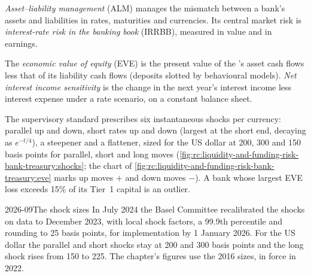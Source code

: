 \begin{definition}\label{def:rc:liquidity-and-funding-risk-bank-treasury:alm}
\emph{Asset--liability management} (ALM) manages the mismatch
between a bank's assets and liabilities in rates, maturities and currencies. Its central market
risk is \emph{interest-rate risk in the banking book}
(IRRBB), measured in value and in earnings.
\end{definition}

\begin{definition}\label{def:rc:liquidity-and-funding-risk-bank-treasury:eve}
The \emph{economic value of equity} (EVE) is the present value of the
's asset cash flows less that of its liability cash flows (deposits slotted by
behavioural models). \emph{Net interest income sensitivity} is
the change in the next year's interest income less interest expense under a rate scenario, on a
constant balance sheet.
\end{definition}

The supervisory standard prescribes six instantaneous shocks per currency: parallel up and down,
short rates up and down (largest at the short end, decaying as $e^{-t/4}$), a steepener and a
flattener, sized for the US dollar at 200, 300 and 150 basis points for parallel, short and long
moves (\cref{fig:rc:liquidity-and-funding-risk-bank-treasury:shocks}; the chart of \cref{fig:rc:liquidity-and-funding-risk-bank-treasury:eve} marks up moves $+$ and down moves $-$). A bank whose largest EVE loss
exceeds 15\% of its Tier~1 capital is an outlier.

\begin{dated}{2026-09}{The shock sizes}\label{dat:rc:liquidity-and-funding-risk-bank-treasury:shocks}
In July 2024 the Basel Committee recalibrated the shocks on data to December 2023, with local shock
factors, a 99.9th percentile and rounding to 25 basis points, for implementation by 1 January 2026. For the
US dollar the parallel and short shocks stay at 200 and 300 basis points and the long shock rises from 150
to 225. The chapter's figures use the 2016 sizes, in force in 2022.
\end{dated}

